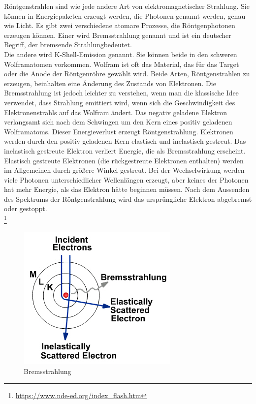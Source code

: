 \grqq Röntgenstrahlen sind wie jede andere Art von elektromagnetischer Strahlung. Sie können in Energiepaketen erzeugt werden, die Photonen genannt werden, genau wie Licht. Es gibt zwei verschiedene atomare Prozesse, die Röntgenphotonen erzeugen können. Einer wird Bremsstrahlung genannt und ist ein deutscher Begriff, der \grqq bremsende Strahlung\grqq bedeutet.\\Die andere wird K-Shell-Emission genannt. Sie können beide in den schweren Wolframatomen vorkommen. Wolfram ist oft das Material, das für das Target oder die Anode der Röntgenröhre gewählt wird.
Beide Arten, Röntgenstrahlen zu erzeugen, beinhalten eine Änderung des Zustands von Elektronen. Die Bremsstrahlung ist jedoch leichter zu verstehen, wenn man die klassische Idee verwendet, dass Strahlung emittiert wird, wenn sich die Geschwindigkeit des Elektronenstrahls auf das Wolfram ändert. Das negativ geladene Elektron verlangsamt sich nach dem Schwingen um den Kern eines positiv geladenen Wolframatoms. Dieser Energieverlust erzeugt Röntgenstrahlung. Elektronen werden durch den positiv geladenen Kern elastisch und inelastisch gestreut. Das inelastisch gestreute Elektron verliert Energie, die als Bremsstrahlung erscheint. Elastisch gestreute Elektronen (die rückgestreute Elektronen enthalten) werden im Allgemeinen durch größere Winkel gestreut. Bei der Wechselwirkung werden viele Photonen unterschiedlicher Wellenlängen erzeugt, aber keines der Photonen hat mehr Energie, als das Elektron hätte beginnen müssen. Nach dem Aussenden des Spektrums der Röntgenstrahlung wird das ursprüngliche Elektron abgebremst oder gestoppt.\grqq \\
\footnote[4]{\url{https://www.nde-ed.org/index_flash.htm}}\\
\begin{figure}[htb]
  \centering  
  \includegraphics[scale=0.7]{img/Bremsstrahlung.jpg}
  \caption{Bremsstrahlung}
  \label{fig:Bremsstrahlung}
\end{figure}
